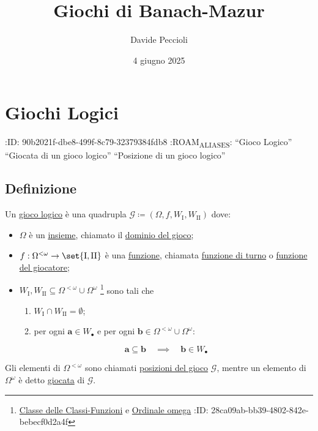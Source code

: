 \documentclass{article}
\author{Davide Peccioli}
\date{4 giugno 2025}
\title{Giochi di Banach-Mazur}
\newcommand{\1}{\mathds{1}}
\begin{document}
\maketitle
\tableofcontents

\section{Giochi Logici}
\label{sec:org7949131}

:ID:       90b2021f-dbe8-499f-8c79-32379384fdb8
:ROAM\textsubscript{ALIASES}: ``Gioco Logico'' ``Giocata di un gioco logico'' ``Posizione di un gioco logico''
\subsection{Definizione}
\label{sec:org0010399}
Un \uline{gioco logico} è una quadrupla \(\mathcal{G} \coloneqq (\Omega, f, W_{\text{I}}, W_{\text{II}})\) dove:
\begin{itemize}
\item \(\Omega\) è un \href{../../../../../../../org/roam/20250130104331-insieme_mk.org}{insieme}, chiamato il \uline{dominio del gioco};
\item \(f:\Omega^{<\omega}\to \set{\text{I},\text{II}}\) è una \href{../../../../../../../org/roam/20250202170607-classe_relazione_binaria.org}{funzione}, chiamata \uline{funzione di turno} o \uline{funzione del giocatore};
\item \(W_{\text{I}},W_{\text{II}} \subseteq \Omega^{<\omega}\cup \Omega^{\omega}\) \footnote{\href{../../../../../../../org/roam/20250202192030-classe_delle_classi_funzioni.org}{Classe delle Classi-Funzioni} e \href{../../../../../../../org/roam/20250203161110-numeri_naturali_sono_ordinali.org}{Ordinale omega}
:ID:       28ca09ab-bb39-4802-842e-bebecf0d2a4f} sono tali che
\begin{enumerate}
\item \(W_{\text{I}}\cap W_{\text{II}} = \emptyset\);
\item per ogni \(\bm{a} \in W_{\bullet}\) e per ogni \(\bm{b} \in\Omega^{<\omega}\cup \Omega^{\omega}\):
\end{enumerate}
\begin{equation*}
  \bm{a} \subseteq \bm{b}\quad\implies\quad \bm{b} \in W_{\bullet}
\end{equation*}
\end{itemize}

Gli elementi di \(\Omega^{<\omega}\) sono chiamati \uline{posizioni del gioco} \(\mathcal{G}\), mentre un elemento di \(\Omega^{\omega}\) è detto \uline{giocata} di \(\mathcal{G}\).
\end{document}
